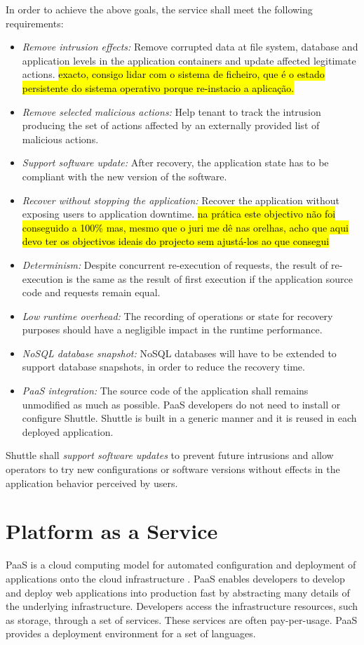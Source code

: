 In order to achieve the above goals, the service shall meet the following requirements: 
\begin{itemize}
\item \textit{Remove intrusion effects:} Remove corrupted data at file system, database and application levels in the application containers and update affected legitimate actions. \hl{exacto, consigo lidar com o sistema de ficheiro, que é o estado persistente do sistema operativo porque re-instacio a aplicação.}
\item \textit{Remove selected malicious actions:} Help tenant to track the intrusion producing the set of actions affected by an externally provided list of malicious actions.
\item \textit{Support software update:} After recovery, the application state has to be compliant with the new version of the software.
\item \textit{Recover without stopping the application:} Recover the application without exposing users to application downtime. \hl{ na prática este objectivo não foi conseguido a 100\% mas, mesmo que o juri me dê nas orelhas, acho que aqui devo ter os objectivos ideais do projecto sem ajustá-los ao que consegui}
\item \textit{Determinism:} Despite concurrent re-execution of requests, the result of re-execution is the same as the result of first execution if the application source code and requests remain equal.
\item \textit{Low runtime overhead:} The recording of operations or state for recovery purposes should have a negligible impact in the runtime performance.
\item \textit{\acs{NoSQL} database snapshot:} \acs{NoSQL} databases will have to be extended to support database snapshots, in order to reduce the recovery time.
\item \textit{\ac{PaaS} integration:} The source code of the application shall remains unmodified as much as possible. \ac{PaaS} developers do not need to install or configure Shuttle. Shuttle is built in a generic manner and it is reused in each deployed application.
\end{itemize}

Shuttle shall \textit{support software updates} to prevent future intrusions and allow operators to try new configurations or software versions without effects in the application behavior perceived by users. 


\section{Platform as a Service}
\label{sec:arch:paas}
\acf{PaaS} is a cloud computing model for automated configuration and deployment of applications onto the cloud infrastructure \cite{Vaquero2008,Vaquero2011,Armbrust,Mell}. \ac{PaaS} enables developers to develop and deploy web applications into production fast by abstracting many details of the underlying infrastructure. Developers access the infrastructure resources, such as storage, through a set of services. These services are often pay-per-usage. \ac{PaaS} provides a deployment environment for a set of languages. 

